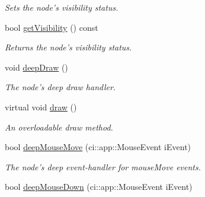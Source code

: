 \begin{DoxyCompactItemize}
\begin{DoxyCompactList}\small\item\em Sets the node's visibility status. \end{DoxyCompactList}\item 
\hypertarget{class_gui_base_a80bfb0340d9997bed8602bbdf68d1c3a}{bool \hyperlink{class_gui_base_a80bfb0340d9997bed8602bbdf68d1c3a}{get\-Visibility} () const }\label{class_gui_base_a80bfb0340d9997bed8602bbdf68d1c3a}

\begin{DoxyCompactList}\small\item\em Returns the node's visibility status. \end{DoxyCompactList}\item 
\hypertarget{class_gui_base_a4f9320c8800cf8ee4286cf285b94354d}{void \hyperlink{class_gui_base_a4f9320c8800cf8ee4286cf285b94354d}{deep\-Draw} ()}\label{class_gui_base_a4f9320c8800cf8ee4286cf285b94354d}

\begin{DoxyCompactList}\small\item\em The node's deep draw handler. \end{DoxyCompactList}\item 
\hypertarget{class_gui_base_abad037dd46417bb2170d0981751da6e9}{virtual void \hyperlink{class_gui_base_abad037dd46417bb2170d0981751da6e9}{draw} ()}\label{class_gui_base_abad037dd46417bb2170d0981751da6e9}

\begin{DoxyCompactList}\small\item\em An overloadable draw method. \end{DoxyCompactList}\item 
\hypertarget{class_gui_base_a82f0c6988d8462ebe533ad8fed99cd78}{bool \hyperlink{class_gui_base_a82f0c6988d8462ebe533ad8fed99cd78}{deep\-Mouse\-Move} (ci\-::app\-::\-Mouse\-Event i\-Event)}\label{class_gui_base_a82f0c6988d8462ebe533ad8fed99cd78}

\begin{DoxyCompactList}\small\item\em The node's deep event-\/handler for mouse\-Move events. \end{DoxyCompactList}\item 
\hypertarget{class_gui_base_af5cfa808f38454d6b33d90a72ca13f52}{bool \hyperlink{class_gui_base_af5cfa808f38454d6b33d90a72ca13f52}{deep\-Mouse\-Down} (ci\-::app\-::\-Mouse\-Event i\-Event)}\label{class_gui_base_af5cfa808f38454d6b33d90a72ca13f52}


\end{DoxyCompactItemize}
